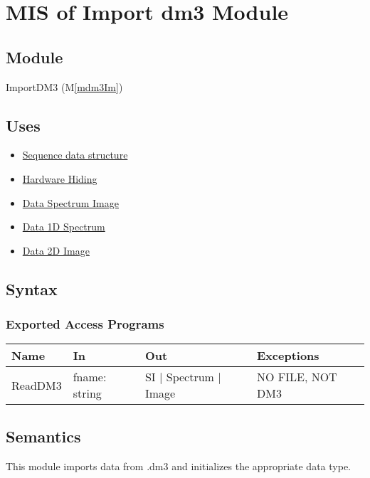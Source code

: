 \documentclass[12pt, titlepage]{article}
\newcommand{\mref}[1]{M\ref{#1}}
\begin{document}
\newpage
\section{MIS of Import dm3 Module} \label{Mod:ImportDM3}

\subsection{Module}

ImportDM3 (\mref{mdm3Im})

\subsection{Uses}
\begin{itemize}
    \item \hyperref[Mod:Seq]{Sequence data structure}
    \item \hyperref[Mod:HH]{Hardware Hiding}
    \item \hyperref[Mod:SI]{Data Spectrum Image}
    \item \hyperref[Mod:Spectrum]{Data 1D Spectrum}
    \item \hyperref[Mod:Image]{Data 2D Image}
\end{itemize}

\subsection{Syntax}

\subsubsection{Exported Access Programs}

\begin{center}
    \begin{tabular}{p{2cm} p{4cm} p{4cm} p{4cm}}
        \hline
        \textbf{Name} & \textbf{In} & \textbf{Out} & \textbf{Exceptions} \\
        \hline
        ReadDM3 & fname: string & SI $|$ Spectrum $|$ Image & NO FILE, NOT DM3 \\
        \hline
    \end{tabular}
\end{center}

\subsection{Semantics}
This module imports data from .dm3 and initializes the appropriate data type.
\end{document}
